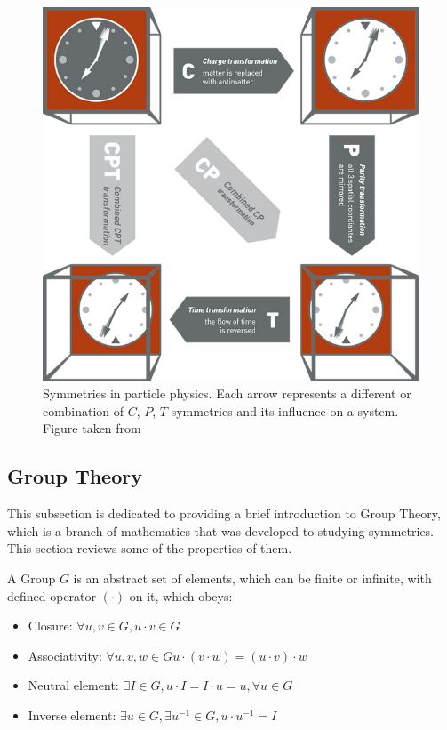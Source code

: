 \begin{figure}
\centering
\includegraphics[scale=0.6]{figures/CPT.png}
\caption{Symmetries in particle physics. Each arrow represents a different or combination of $C$, $P$, $T$ symmetries and its influence on a system. Figure taken from \cite{CPT}
\label{fig:CPT}}
\end{figure}





\subsection{Group Theory}
This subsection is dedicated to providing a brief introduction to Group Theory, which is a branch of mathematics that was developed to studying symmetries. This section reviews some of the properties of them.

A Group $G$ is an abstract set of elements, which can be finite or infinite, with defined operator $(\cdot)$ on it, which obeys:

\begin{itemize}
    \item Closure: $\forall u,v \in G, u\cdot v \in G$
    \item Associativity: $\forall u,v,w \in G u \cdot (v \cdot w ) = (u \cdot v) \cdot w$
    \item Neutral element:  $\exists I \in G, u \cdot I = I \cdot u = u, \forall u \in G$
    \item Inverse element:  $\exists u \in G, \exists u^{-1} \in G, u \cdot u^{-1} = I$
\end{itemize}

